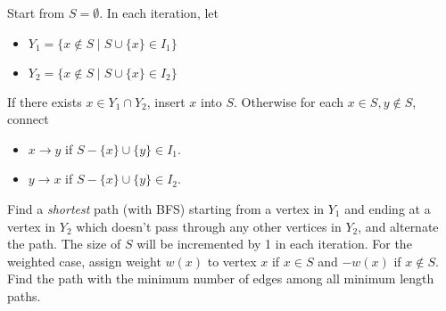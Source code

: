 Start from $S = \emptyset$. In each iteration, let 
\vspace{-0.5em}
\begin{itemize}
    \itemsep-0.5em
  \item $Y_1 = \{x \not\in S \mid S \cup \{x\} \in I_1 \}$
  \item $Y_2 = \{x \not\in S \mid S \cup \{x\} \in I_2 \}$
\end{itemize}
If there exists $x \in Y_1 \cap Y_2$, insert $x$ into $S$. Otherwise for each $x \in S, y \not\in S$, connect
\vspace{-0.5em}
\begin{itemize}
    \itemsep-0.5em
  \item $x \to y$ if $S - \{x\} \cup \{y\} \in I_1$.
  \item $y \to x$ if $S - \{x\} \cup \{y\} \in I_2$.
\end{itemize}
Find a \textit{shortest} path (with BFS) starting from a vertex in $Y_1$ and ending at a vertex in $Y_2$ which doesn't pass through any other vertices in $Y_2$, and alternate the path. The size of $S$ will be incremented by 1 in each iteration. For the weighted case, assign weight $w(x)$ to vertex $x$ if $x \in S$ and $-w(x)$ if $x \not\in S$. Find the path with the minimum number of edges among all minimum length paths.
